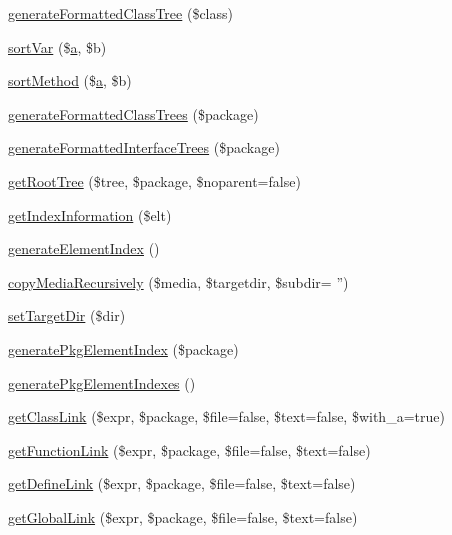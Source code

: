 \begin{DoxyCompactItemize}
\hyperlink{class_h_t_m_lframes_converter_a694db0f7353906320d85ee37bd7e2fc5}{generate\-Formatted\-Class\-Tree} (\$class)
\item 
\hyperlink{class_h_t_m_lframes_converter_a289e8b5fc5ba77255d344e7d24ac64a5}{sort\-Var} (\$\hyperlink{classa}{a}, \$b)
\item 
\hyperlink{class_h_t_m_lframes_converter_ac169dd8b41da10e16c21f4e6685ee3af}{sort\-Method} (\$\hyperlink{classa}{a}, \$b)
\item 
\hyperlink{class_h_t_m_lframes_converter_ac4ce6d55dd5c5683966b882dcc6809e0}{generate\-Formatted\-Class\-Trees} (\$package)
\item 
\hyperlink{class_h_t_m_lframes_converter_a0950322f71c6ac513f10e25f12aefcf0}{generate\-Formatted\-Interface\-Trees} (\$package)
\item 
\hyperlink{class_h_t_m_lframes_converter_a28800b40ee0b082b3e6bf82844c2037c}{get\-Root\-Tree} (\$tree, \$package, \$noparent=false)
\item 
\hyperlink{class_h_t_m_lframes_converter_afe3edf57e42768ce6a310e1004aef16b}{get\-Index\-Information} (\$elt)
\item 
\hyperlink{class_h_t_m_lframes_converter_a2b514cc775614890edad823f189b2655}{generate\-Element\-Index} ()
\item 
\hyperlink{class_h_t_m_lframes_converter_ac7d72a781ca48beca5f279582f7e37b1}{copy\-Media\-Recursively} (\$media, \$targetdir, \$subdir= '')
\item 
\hyperlink{class_h_t_m_lframes_converter_a07611111094b2954729773f6436a0fe1}{set\-Target\-Dir} (\$dir)
\item 
\hyperlink{class_h_t_m_lframes_converter_ad067ad187db8d433a5de042050c63ada}{generate\-Pkg\-Element\-Index} (\$package)
\item 
\hyperlink{class_h_t_m_lframes_converter_a147e3da92be9273af6ea18e5a20beeaa}{generate\-Pkg\-Element\-Indexes} ()
\item 
\hyperlink{class_h_t_m_lframes_converter_a8b3bb3ebb1cf7b7a31ef71cbe4dcca9e}{get\-Class\-Link} (\$expr, \$package, \$file=false, \$text=false, \$with\-\_\-a=true)
\item 
\hyperlink{class_h_t_m_lframes_converter_ab5f43d9a50aae936411c84a680e9c186}{get\-Function\-Link} (\$expr, \$package, \$file=false, \$text=false)
\item 
\hyperlink{class_h_t_m_lframes_converter_a17086c17d82323b3e929d24ad6da092d}{get\-Define\-Link} (\$expr, \$package, \$file=false, \$text=false)
\item 
\hyperlink{class_h_t_m_lframes_converter_afef6bfb2b26aac19e52a1d153d4bae4b}{get\-Global\-Link} (\$expr, \$package, \$file=false, \$text=false)

\end{DoxyCompactItemize}
